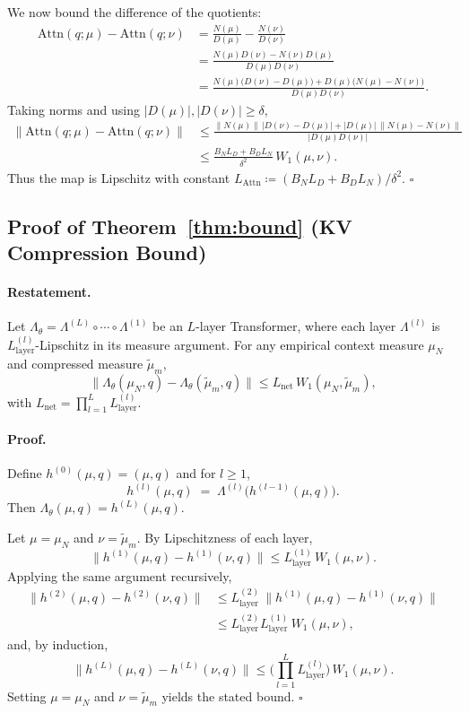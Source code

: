 \documentclass{article}
\theoremstyle{plain}
\theoremstyle{definition}
\theoremstyle{remark}
\newcommand{\muN}{\mu_N} %
\newcommand{\Wass}[1]{W_{#1}} %
\newcommand{\Attn}{\text{Attn}}
\begin{document}
We now bound the difference of the quotients:
\begin{align*}
    \Attn(q;\mu) - \Attn(q;\nu)
    &= \frac{N(\mu)}{D(\mu)} - \frac{N(\nu)}{D(\nu)} \\
    &= \frac{N(\mu)D(\nu) - N(\nu)D(\mu)}{D(\mu)D(\nu)} \\
    &= \frac{N(\mu)\big(D(\nu)-D(\mu)\big)
        + D(\mu)\big(N(\mu)-N(\nu)\big)}
       {D(\mu)D(\nu)} .
\end{align*}
Taking norms and using $|D(\mu)|,|D(\nu)|\ge\delta$,
\begin{align*}
    \big\|\Attn(q;\mu)-\Attn(q;\nu)\big\|
    &\le
    \frac{\|N(\mu)\|\,|D(\nu)-D(\mu)|
          + |D(\mu)|\,\|N(\mu)-N(\nu)\|}
         {|D(\mu)D(\nu)|} \\
    &\le
    \frac{B_N L_D + B_D L_N}{\delta^2} \, \Wass{1}(\mu,\nu).
\end{align*}
Thus the map is Lipschitz with constant
$L_{\Attn} \coloneqq (B_N L_D + B_D L_N)/\delta^2$. \hfill$\square$

\subsection{Proof of Theorem~\ref{thm:bound} (KV Compression Bound)}
\label{app:proof_bound}

\paragraph{Restatement.}
Let $\Lambda_\theta = \Lambda^{(L)}\circ\cdots\circ\Lambda^{(1)}$ be an $L$-layer
Transformer, where each layer $\Lambda^{(l)}$ is $L_{\text{layer}}^{(l)}$-Lipschitz in
its measure argument. For any empirical context measure $\muN$ and compressed measure
$\tilde\mu_m$,
\[
    \big\|\Lambda_\theta(\muN,q) - \Lambda_\theta(\tilde\mu_m,q)\big\|
    \le
    L_{\text{net}}\,\Wass{1}(\muN,\tilde\mu_m),
\]
with $L_{\text{net}} = \prod_{l=1}^L L_{\text{layer}}^{(l)}$.

\paragraph{Proof.}
Define $h^{(0)}(\mu,q) = (\mu,q)$ and for $l\ge 1$,
\[
    h^{(l)}(\mu,q)
    \;=\;
    \Lambda^{(l)}\big(h^{(l-1)}(\mu,q)\big).
\]
Then $\Lambda_\theta(\mu,q) = h^{(L)}(\mu,q)$.

Let $\mu=\muN$ and $\nu=\tilde\mu_m$. By Lipschitzness of each layer,
\[
    \big\|h^{(1)}(\mu,q)-h^{(1)}(\nu,q)\big\|
    \le
    L_{\text{layer}}^{(1)} \,\Wass{1}(\mu,\nu).
\]
Applying the same argument recursively,
\begin{align*}
    \big\|h^{(2)}(\mu,q)-h^{(2)}(\nu,q)\big\|
    &\le
    L_{\text{layer}}^{(2)} \,
    \big\|h^{(1)}(\mu,q)-h^{(1)}(\nu,q)\big\| \\
    &\le
    L_{\text{layer}}^{(2)} L_{\text{layer}}^{(1)} \,
    \Wass{1}(\mu,\nu),
\end{align*}
and, by induction,
\[
    \big\|h^{(L)}(\mu,q)-h^{(L)}(\nu,q)\big\|
    \le
    \Big(\prod_{l=1}^L L_{\text{layer}}^{(l)}\Big)\,
    \Wass{1}(\mu,\nu).
\]
Setting $\mu=\muN$ and $\nu=\tilde\mu_m$ yields the stated bound. \hfill$\square$
\end{document}

